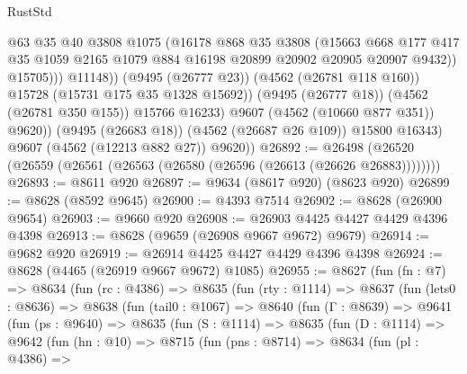 \begin{lexlean}{RustStd}
\begin{coremodule}
                            @63
                            @35
                            @40
                            @3808
                            @1075
                            (@16178
                              @868
                              @35
                              @3808
                              (@15663
                                @668
                                @177
                                @417
                                @35
                                @1059
                                @2165
                                @1079
                                @884
                                @16198
                                @20899
                                @20902
                                @20905
                                @20907
                                @9432))
                            @15705)))
                      @11148))
                  (@9495 (@26777 @23))
                  (@4562 (@26781 @118 @160))
                  @15728
                  (@15731 @175 @35 @1328 @15692))
                (@9495 (@26777 @18))
                (@4562 (@26781 @350 @155))
                @15766
                @16233)
              @9607
              (@4562 (@10660 @877 @351))
              @9620))
          (@9495 (@26683 @18))
          (@4562 (@26687 @26 @109))
          @15800
          @16343)
        @9607
        (@4562 (@12213 @882 @27))
        @9620))
@26892 := @26498 (@26520 (@26559 (@26561 (@26563 (@26580 (@26596 (@26613 (@26626 @26883))))))))
@26893 := @8611 @920
@26897 := @9634 (@8617 @920) (@8623 @920)
@26899 := @8628 (@8592 @9645)
@26900 := @4393 @7514
@26902 := @8628 (@26900 @9654)
@26903 := @9660 @920
@26908 := @26903 @4425 @4427 @4429 @4396 @4398
@26913 := @8628 (@9659 (@26908 @9667 @9672) @9679)
@26914 := @9682 @920
@26919 := @26914 @4425 @4427 @4429 @4396 @4398
@26924 := @8628 (@4465 (@26919 @9667 @9672) @1085)
@26955 := @8627
    (fun (fn : @7) =>
    @8634
      (fun (rc : @4386) =>
      @8635
        (fun (rty : @1114) =>
        @8637
          (fun (lets0 : @8636) =>
          @8638
            (fun (tail0 : @1067) =>
            @8640
              (fun (Γ : @8639) =>
              @9641
                (fun (ps : @9640) =>
                @8635
                  (fun (S : @1114) =>
                  @8635
                    (fun (D : @1114) =>
                    @9642
                      (fun (hn : @10) =>
                      @8715
                        (fun (pns : @8714) =>
                        @8634
                          (fun (pl : @4386) =>

\end{coremodule}
\end{lexlean}
